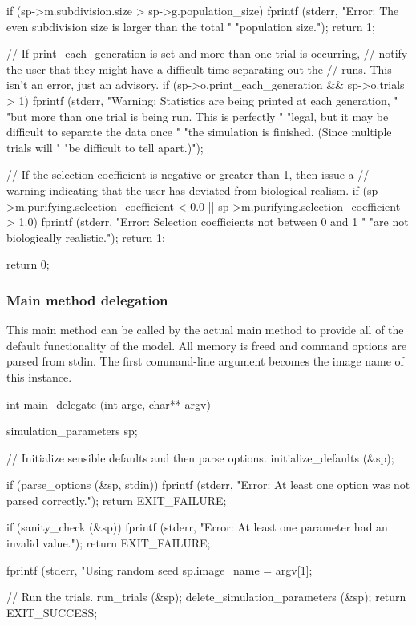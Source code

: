 \documentclass{article}
\begin{document}
\begin{ccode}
{{    if (sp->m.subdivision.size > sp->g.population_size) {
      fprintf (stderr, "Error: The even subdivision size is larger than the total "
		       "population size.\n");
      return 1;
    }
  }

  // If print_each_generation is set and more than one trial is occurring,
  // notify the user that they might have a difficult time separating out the
  // runs. This isn't an error, just an advisory.
  if (sp->o.print_each_generation && sp->o.trials > 1)
    fprintf (stderr, "Warning: Statistics are being printed at each generation, "
		     "but more than one trial is being run. This is perfectly "
		     "legal, but it may be difficult to separate the data once "
		     "the simulation is finished. (Since multiple trials will "
		     "be difficult to tell apart.)\n");

  // If the selection coefficient is negative or greater than 1, then issue a
  // warning indicating that the user has deviated from biological realism.
  if (sp->m.purifying.selection_coefficient < 0.0 ||
      sp->m.purifying.selection_coefficient > 1.0) {
    fprintf (stderr, "Error: Selection coefficients not between 0 and 1 "
		     "are not biologically realistic.\n");
    return 1;
  }

  return 0;
}
\end{ccode}

      \subsubsection{Main method delegation}
	\label{sec:main-method-delegation}

	This main method can be called by the actual main method to provide all
	of the default functionality of the model. All memory is freed and
	command options are parsed from stdin. The first command-line argument
	becomes the image name of this instance.

\begin{ccode}
int main_delegate (int argc, char** argv) {
  simulation_parameters sp;

  // Initialize sensible defaults and then parse options.
  initialize_defaults (&sp);

  if (parse_options (&sp, stdin)) {
    fprintf (stderr, "Error: At least one option was not parsed correctly.\n");
    return EXIT_FAILURE;
  }

  if (sanity_check (&sp)) {
    fprintf (stderr, "Error: At least one parameter had an invalid value.\n");
    return EXIT_FAILURE;
  }

  fprintf (stderr, "Using random seed %
  sp.image_name = argv[1];

  // Run the trials.
  run_trials (&sp);
  delete_simulation_parameters (&sp);
  return EXIT_SUCCESS;
}
\end{ccode}
\end{document}
